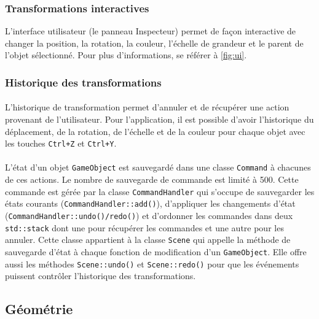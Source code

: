 \subsubsection{Transformations interactives}
L’interface utilisateur (le panneau Inspecteur) permet de façon interactive de changer la position, la rotation, la couleur, l’échelle de grandeur et le parent de l’objet sélectionné. Pour plus d’informations, se référer à \ref{fig:ui}.

\subsubsection{Historique des transformations}
\paragraph{} L'historique de transformation permet d'annuler et de récupérer une action provenant de l'utilisateur. Pour l'application, il est possible d'avoir l'historique du déplacement, de la rotation, de l'échelle et de la couleur pour chaque objet avec les touches \texttt{Ctrl+Z} et \texttt{Ctrl+Y}.
\paragraph{} L'état d'un objet \texttt{GameObject} est sauvegardé dans une classe \texttt{Command} à chacunes de ces actions. Le nombre de sauvegarde de commande est limité à 500. Cette commande est gérée par la classe \texttt{CommandHandler} qui s'occupe de sauvegarder les états courants (\texttt{CommandHandler::add()}), d'appliquer les changements d'état (\texttt{CommandHandler::undo()/redo()}) et d'ordonner les commandes dans deux \texttt{std::stack} dont une pour récupérer les commandes et une autre pour les annuler. Cette classe appartient à la classe \texttt{Scene} qui appelle la méthode de sauvegarde d'état à chaque fonction de modification d'un \texttt{GameObject}. Elle offre aussi les méthodes \texttt{Scene::undo()} et \texttt{Scene::redo()} pour que les événements puissent contrôler l'historique des transformations.

\subsection{Géométrie}
